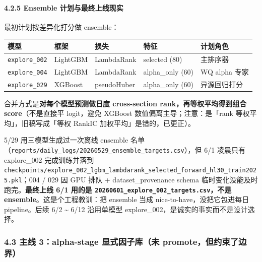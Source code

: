 \documentclass[
  fontset=fandol]{ctexart}
\begin{document}
\hypertarget{ensemble-ux8ba1ux5212ux4e0eux6700ux7ec8ux4e0aux7ebfux73b0ux5b9e}{%
\paragraph{4.2.5 Ensemble
计划与最终上线现实}\label{ensemble-ux8ba1ux5212ux4e0eux6700ux7ec8ux4e0aux7ebfux73b0ux5b9e}}

最初计划按差异化打分做 ensemble：

\begin{longtable}[]{@{}
  >{\raggedright\arraybackslash}p{}
  >{\raggedright\arraybackslash}p{}
  >{\raggedright\arraybackslash}p{}
  >{\raggedright\arraybackslash}p{}
  >{\raggedright\arraybackslash}p{}@{}}
\toprule
模型 & 框架 & 损失 & 特征 & 计划角色 \\
\midrule
\endhead
\texttt{explore\_002} & LightGBM &
LambdaRank & selected (80) & 主排序器 \\
\texttt{explore\_004} & LightGBM &
LambdaRank & alpha\_only (60) & WQ alpha
专家 \\
\texttt{explore\_029} & XGBoost &
pseudoHuber & alpha\_only (60) &
异源回归打分 \\
\bottomrule
\end{longtable}

合并方式是\textbf{对每个模型预测做日度
cross-section rank，再等权平均得到组合
score}（不是直接平 logit，避免 XGBoost
数值偏离主导；注意：是「rank
等权平均」，旧稿写成「等权 RankIC
加权平均」是错的，已更正）。

5/29 用三模型生成过一次离线 ensemble
名单（\texttt{reports/daily\_logs/20260529\_ensemble\_targets.csv}），但
6/1 凌晨只有 explore\_002 完成训练并落到
\texttt{checkpoints/explore\_002\_lgbm\_lambdarank\_selected\_forward\_hl30\_train2025.pkl}；004
/ 029 因 GPU 排队 + dataset\_provenance
schema
临时变化没能及时跑完。\textbf{最终上线
6/1 用的是
\texttt{20260601\_explore\_002\_targets.csv}，不是
ensemble}。这是个工程教训：把 ensemble
当成 nice-to-have，没把它包进每日
pipeline。后续 6/2 \textasciitilde{}
6/12 沿用单模型
explore\_002，是诚实的事实而不是设计选择。

\hypertarget{ux4e3bux7ebf-3alpha-stage-ux663eux5f0fux56e0ux5b50ux5e93ux672a-promoteux4f46ux7ea6ux675fux4e86ux8fb9ux754c}{%
\subsubsection{4.3 主线 3：alpha-stage
显式因子库（未
promote，但约束了边界）}\label{ux4e3bux7ebf-3alpha-stage-ux663eux5f0fux56e0ux5b50ux5e93ux672a-promoteux4f46ux7ea6ux675fux4e86ux8fb9ux754c}}
\end{document}
